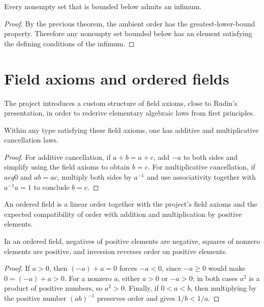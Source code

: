 \begin{theorem}
\label{thm:inf-characterization}
Every nonempty set that is bounded below admits an infimum.
\begin{proof}
By the previous theorem, the ambient order has the greatest-lower-bound property. Therefore any
nonempty set bounded below has an element satisfying the defining conditions of the infimum.
\end{proof}
\end{theorem}

\section{Field axioms and ordered fields}

\begin{definition}
\label{def:field-axioms}
The project introduces a custom structure of field axioms, close to Rudin's presentation,
in order to rederive elementary algebraic laws from first principles.
\end{definition}

\begin{theorem}
\label{thm:field-basic-cancellation}
Within any type satisfying these field axioms, one has additive and multiplicative
cancellation laws.
\begin{proof}
For additive cancellation, if $a+b=a+c$, add $-a$ to both sides and simplify using the field
axioms to obtain $b=c$. For multiplicative cancellation, if $a
eq 0$ and $ab=ac$, multiply
both sides by $a^{-1}$ and use associativity together with $a^{-1}a=1$ to conclude $b=c$.
\end{proof}
\end{theorem}

\begin{definition}
\label{def:ordered-field}
An ordered field is a linear order together with the project's field axioms and the expected
compatibility of order with addition and multiplication by positive elements.
\end{definition}

\begin{theorem}
\label{thm:ordered-field-sign-laws}
In an ordered field, negatives of positive elements are negative, squares of nonzero
elements are positive, and inversion reverses order on positive elements.
\begin{proof}
If $a>0$, then $(-a)+a=0$ forces $-a<0$, since $-a\ge 0$ would make $0=(-a)+a>0$. For a
nonzero $a$, either $a>0$ or $-a>0$; in both cases $a^2$ is a product of positive numbers, so
$a^2>0$. Finally, if $0<a<b$, then multiplying by the positive number $(ab)^{-1}$ preserves
order and gives $1/b<1/a$.
\end{proof}
\end{theorem}

